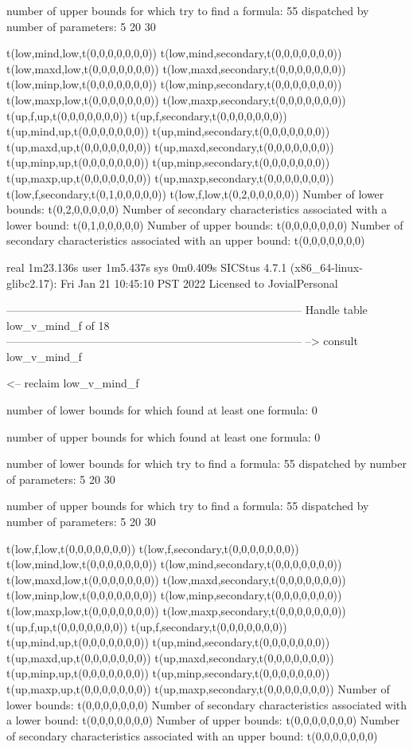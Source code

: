 number of upper bounds for which try to find a formula: 55
dispatched by number of parameters: 5  20  30

t(low,mind,low,t(0,0,0,0,0,0,0))
t(low,mind,secondary,t(0,0,0,0,0,0,0))
t(low,maxd,low,t(0,0,0,0,0,0,0))
t(low,maxd,secondary,t(0,0,0,0,0,0,0))
t(low,minp,low,t(0,0,0,0,0,0,0))
t(low,minp,secondary,t(0,0,0,0,0,0,0))
t(low,maxp,low,t(0,0,0,0,0,0,0))
t(low,maxp,secondary,t(0,0,0,0,0,0,0))
t(up,f,up,t(0,0,0,0,0,0,0))
t(up,f,secondary,t(0,0,0,0,0,0,0))
t(up,mind,up,t(0,0,0,0,0,0,0))
t(up,mind,secondary,t(0,0,0,0,0,0,0))
t(up,maxd,up,t(0,0,0,0,0,0,0))
t(up,maxd,secondary,t(0,0,0,0,0,0,0))
t(up,minp,up,t(0,0,0,0,0,0,0))
t(up,minp,secondary,t(0,0,0,0,0,0,0))
t(up,maxp,up,t(0,0,0,0,0,0,0))
t(up,maxp,secondary,t(0,0,0,0,0,0,0))
t(low,f,secondary,t(0,1,0,0,0,0,0))
t(low,f,low,t(0,2,0,0,0,0,0))
Number of lower bounds:                                             t(0,2,0,0,0,0,0)
Number of secondary characteristics associated with a lower bound:  t(0,1,0,0,0,0,0)
Number of upper bounds:                                             t(0,0,0,0,0,0,0)
Number of secondary characteristics associated with an upper bound: t(0,0,0,0,0,0,0)

real	1m23.136s
user	1m5.437s
sys	0m0.409s
SICStus 4.7.1 (x86_64-linux-glibc2.17): Fri Jan 21 10:45:10 PST 2022
Licensed to JovialPersonal


--------------------------------------------------------------------------------
Handle table low_v_mind_f of 18
--------------------------------------------------------------------------------
--> consult low_v_mind_f

<-- reclaim low_v_mind_f

number of lower bounds for which found at least one formula: 0

number of upper bounds for which found at least one formula: 0

number of lower bounds for which try to find a formula: 55
dispatched by number of parameters: 5  20  30

number of upper bounds for which try to find a formula: 55
dispatched by number of parameters: 5  20  30

t(low,f,low,t(0,0,0,0,0,0,0))
t(low,f,secondary,t(0,0,0,0,0,0,0))
t(low,mind,low,t(0,0,0,0,0,0,0))
t(low,mind,secondary,t(0,0,0,0,0,0,0))
t(low,maxd,low,t(0,0,0,0,0,0,0))
t(low,maxd,secondary,t(0,0,0,0,0,0,0))
t(low,minp,low,t(0,0,0,0,0,0,0))
t(low,minp,secondary,t(0,0,0,0,0,0,0))
t(low,maxp,low,t(0,0,0,0,0,0,0))
t(low,maxp,secondary,t(0,0,0,0,0,0,0))
t(up,f,up,t(0,0,0,0,0,0,0))
t(up,f,secondary,t(0,0,0,0,0,0,0))
t(up,mind,up,t(0,0,0,0,0,0,0))
t(up,mind,secondary,t(0,0,0,0,0,0,0))
t(up,maxd,up,t(0,0,0,0,0,0,0))
t(up,maxd,secondary,t(0,0,0,0,0,0,0))
t(up,minp,up,t(0,0,0,0,0,0,0))
t(up,minp,secondary,t(0,0,0,0,0,0,0))
t(up,maxp,up,t(0,0,0,0,0,0,0))
t(up,maxp,secondary,t(0,0,0,0,0,0,0))
Number of lower bounds:                                             t(0,0,0,0,0,0,0)
Number of secondary characteristics associated with a lower bound:  t(0,0,0,0,0,0,0)
Number of upper bounds:                                             t(0,0,0,0,0,0,0)
Number of secondary characteristics associated with an upper bound: t(0,0,0,0,0,0,0)

